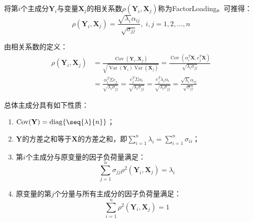 \begin{definition}
	将第$i$个主成分$\mathbf{Y}_i$与变量$\mathbf{X}_j$的相关系数$\rho(\mathbf{Y}_i,\mathbf{X}_j)$称为\gls{FactorLoading}。可推得：
	\begin{equation*}
		\rho(\mathbf{Y}_i,\mathbf{X}_j)=\frac{\sqrt{\lambda_i}\alpha_{ij}}{\sqrt{\sigma_{jj}}},\;i,j=1,2,\dots,n
	\end{equation*}
\end{definition}
\begin{derivation}\label{der:FactorLoading}
	由相关系数的定义：
	\begin{align*}
		\rho(\mathbf{Y}_i,\mathbf{X}_j)
		&=\frac{\operatorname{Cov}(\mathbf{Y}_i,\mathbf{X}_j)}{\sqrt{\operatorname{Var}(\mathbf{Y}_i)\operatorname{Var}(\mathbf{X}_j)}}=\frac{\operatorname{Cov}(\alpha_i^T\mathbf{X},e_j^T\mathbf{X})}{\sqrt{\lambda_i\sigma_{jj}}} \\
		&=\frac{\alpha_i^T\Sigma e_j}{\sqrt{\lambda_i\sigma_{jj}}}=\frac{e_j^T\Sigma\alpha_i}{\sqrt{\lambda_i\sigma_{jj}}}=\frac{e_j^T\lambda_i\alpha_i}{\sqrt{\lambda_i\sigma_{jj}}}=\frac{\sqrt{\lambda_i}\alpha_{ij}}{\sqrt{\sigma_{jj}}}
	\end{align*}
\end{derivation}
\begin{property}
	总体主成分具有如下性质：
	\begin{enumerate}
		\item $\operatorname{Cov}(\mathbf{Y})=\operatorname{diag}\{\seq{\lambda}{n}\}$；
		\item $\mathbf{Y}$的方差之和等于$\mathbf{X}$的方差之和，即$\sum\limits_{i=1}^{n}\lambda_i=\sum\limits_{i=1}^{n}\sigma_{ii}$；
		\item 第$i$个主成分与原变量的因子负荷量满足：
		\begin{equation*}
			\sum_{j=1}^{n}\sigma_{jj}\rho^2(\mathbf{Y}_i,\mathbf{X}_j)=\lambda_i
		\end{equation*}
		\item 原变量的第$j$个分量与所有主成分的因子负荷量满足：
		\begin{equation*}
			\sum_{i=1}^{n}\rho^2(\mathbf{Y}_i,\mathbf{X}_j)=1
		\end{equation*}
	\end{enumerate}
\end{property}
